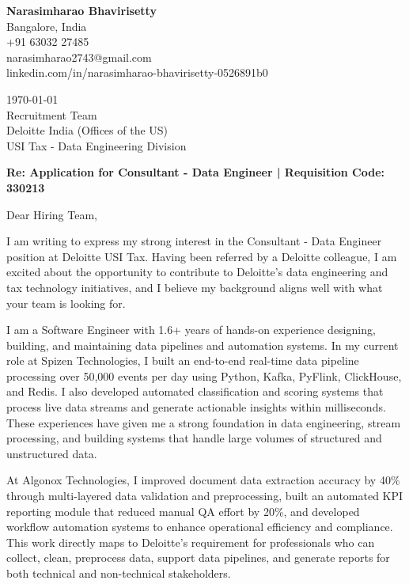 \documentclass[11pt]{article}
\begin{document}
\begin{flushleft}
{\large\textbf{Narasimharao Bhavirisetty}}\\
Bangalore, India\\
+91 63032 27485\\
narasimharao2743@gmail.com\\
linkedin.com/in/narasimharao-bhavirisetty-0526891b0
\end{flushleft}

\vspace{6pt}

\begin{flushleft}
\today\\[6pt]
Recruitment Team\\
Deloitte India (Offices of the US)\\
USI Tax - Data Engineering Division
\end{flushleft}

\vspace{6pt}

\textbf{Re: Application for Consultant - Data Engineer | Requisition Code: 330213}

\vspace{10pt}

Dear Hiring Team,

I am writing to express my strong interest in the Consultant - Data Engineer position at Deloitte USI Tax. Having been referred by a Deloitte colleague, I am excited about the opportunity to contribute to Deloitte's data engineering and tax technology initiatives, and I believe my background aligns well with what your team is looking for.

I am a Software Engineer with 1.6+ years of hands-on experience designing, building, and maintaining data pipelines and automation systems. In my current role at Spizen Technologies, I built an end-to-end real-time data pipeline processing over 50,000 events per day using Python, Kafka, PyFlink, ClickHouse, and Redis. I also developed automated classification and scoring systems that process live data streams and generate actionable insights within milliseconds. These experiences have given me a strong foundation in data engineering, stream processing, and building systems that handle large volumes of structured and unstructured data.

At Algonox Technologies, I improved document data extraction accuracy by 40\% through multi-layered data validation and preprocessing, built an automated KPI reporting module that reduced manual QA effort by 20\%, and developed workflow automation systems to enhance operational efficiency and compliance. This work directly maps to Deloitte's requirement for professionals who can collect, clean, preprocess data, support data pipelines, and generate reports for both technical and non-technical stakeholders.
\end{document}
